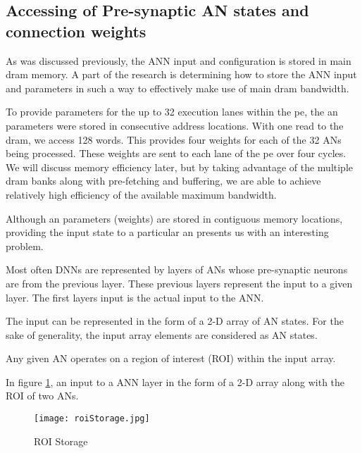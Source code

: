 \subsection{Accessing of Pre-synaptic AN states and connection weights}
\label{sec:AccessingANStates}

As was discussed previously, the ANN input and configuration is stored in main \ac{dram} memory. 
A part of the research is determining how to store the ANN input and parameters in such a way to effectively make use of main \ac{dram} bandwidth. 

To provide parameters for the up to 32 execution lanes within the \ac{pe}, the \ac{an} parameters were stored in consecutive address locations. 
With one read to the \ac{dram}, we access 128 words. This provides four weights for each of the 32 ANs being processed. 
These weights are sent to each lane of the \ac{pe} over four cycles. 
We will discuss memory efficiency later, but by taking advantage of the multiple \ac{dram} banks along with pre-fetching and buffering, we are able to achieve relatively high efficiency of the available maximum bandwidth.

Although \ac{an} parameters (weights) are stored in contiguous memory locations, providing the input state to a particular \ac{an} presents us with an interesting problem.

Most often DNNs are represented by layers of ANs whose pre-synaptic neurons are from the previous layer. These previous layers represent the input to a given layer. The first layers input is the actual input to the ANN.


The input can be represented in the form of a 2-D array of AN states. For the sake of generality, the input array elements are considered as AN states.

Any given AN operates on a region of interest (ROI) within the input array.

In figure \ref{fig:roiStorage}, an input to a ANN layer in the form of a 2-D array along with the ROI of two ANs.

\begin{figure}[!t]
\centering
\captionsetup{justification=centering}
\captionsetup{width=.9\linewidth}
\centerline{
\mbox{\texttt{[image: roiStorage.jpg]}}
}
\caption{ROI Storage}
\label{fig:roiStorage}
\end{figure}

